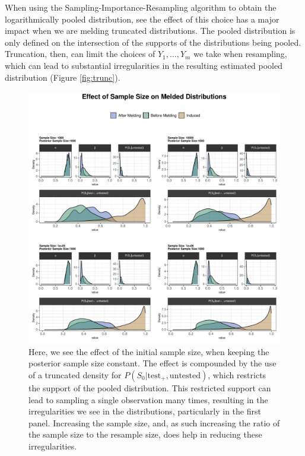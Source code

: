 \documentclass[12pt,twoside]{smiththesis}
\begin{document}
When using the Sampling-Importance-Resampling algorithm to obtain the logarithmically pooled distribution, see the effect of this choice has a major impact when we are melding truncated distributions. The pooled distribution is only defined on the intersection of the supports of the distributions being pooled. Truncation, then, can limit the choices of \(Y_1,\dots, Y_m\) we take when resampling, which can lead to substantial irregularities in the resulting estimated pooled distribution (Figure \ref{fig:trunc}).
\begin{figure}

{\centering \includegraphics[width=1\linewidth]{figure/effect-truncation} 

}

\caption{\label{fig:trunc} Here, we see the effect of the initial sample size, when keeping the posterior sample size constant. The effect is compounded by the use of a truncated density for $P(S_0|\text{test}_+,\text{untested})$, which restricts the support of the pooled distribution. This restricted support can lead to sampling a single observation many times, resulting in the irregularities we see in the distributions, particularly in the first panel. Increasing the sample size, and, as such increasing the ratio of the sample size to the resample size, does help in reducing these irregularities.}\label{fig:unnamed-chunk-29}
\end{figure}
\newpage
\end{document}
